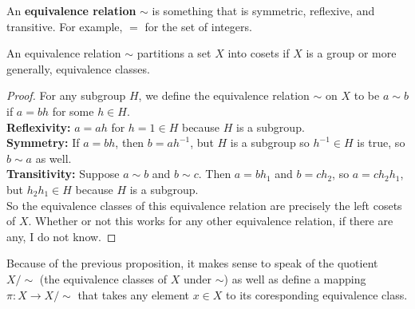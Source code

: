 \begin{df}
An \textbf{equivalence relation} $\sim$ is something that is symmetric,
reflexive, and transitive. For example, $=$ for the set of integers.
\end{df}
\begin{prop}
An equivalence relation $\sim$ partitions a set $X$ into cosets if $X$
is a group or more generally, equivalence classes.
\end{prop}
\begin{proof}
For any subgroup $H$, we define the equivalence relation $\sim$ on $X$
to be $a \sim b$ if $a = bh$ for some $h \in H$. \\
\textbf{Reflexivity:} $a = ah$ for $h = 1 \in H$ because $H$ is a
subgroup. \\
\textbf{Symmetry:} If $a = bh$, then $b = ah^{-1}$, but $H$ is a
subgroup so $h^{-1} \in H$ is true, so $b \sim a$ as well. \\
\textbf{Transitivity:} Suppose $a \sim b$ and $b \sim c$. Then $a =
bh_1$ and $b = ch_2$, so $a = ch_2h_1$, but $h_2 h_1 \in H$ because $H$
is a subgroup. \\
So the equivalence classes of this equivalence relation are precisely
the left cosets of $X$. Whether or not this works for any other
equivalence relation, if there are any, I do not know.
\end{proof}
\begin{rem}
Because of the previous proposition, it makes sense to speak of the
quotient $X/\sim$ (the equivalence classes of $X$ under $\sim$) as well
as define a mapping $\pi : X \rightarrow X/\sim$ that takes any element
$x \in X$ to its coresponding equivalence class.
\end{rem}

